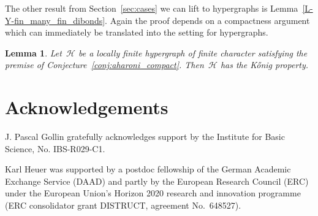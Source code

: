 \documentclass[reqno, 12pt]{amsart}
\numberwithin{equation}{section}
\numberwithin{figure}{section}
\theoremstyle{plain}
\newtheorem{lemma}[thm]{Lemma}
\theoremstyle{definition}
\begin{document}
The other result from Section~\ref{sec:cases} we can lift to hypergraphs is Lemma~\ref{L-Y-fin_many_fin_dibonds}.
Again the proof depends on a compactness argument which can immediately be translated into the setting for hypergraphs.

\begin{lemma}\label{lem:aharoni_loc_fin}
     Let~$\mathcal{H}$ be a locally finite hypergraph of finite character satisfying the premise of Conjecture~\ref{conj:aharoni_compact}. 
     Then~$\mathcal{H}$ has the K\H{o}nig property. 
\end{lemma}


\section*{Acknowledgements}
J. Pascal Gollin gratefully acknowledges support by the Institute for Basic Science, No. IBS-R029-C1. 

Karl Heuer was supported by a postdoc fellowship of the German Academic Exchange Service (DAAD) and partly by the European Research Council (ERC) under the European Union's Horizon 2020 research and innovation programme (ERC consolidator grant DISTRUCT, agreement No.\ 648527).



\end{document}

